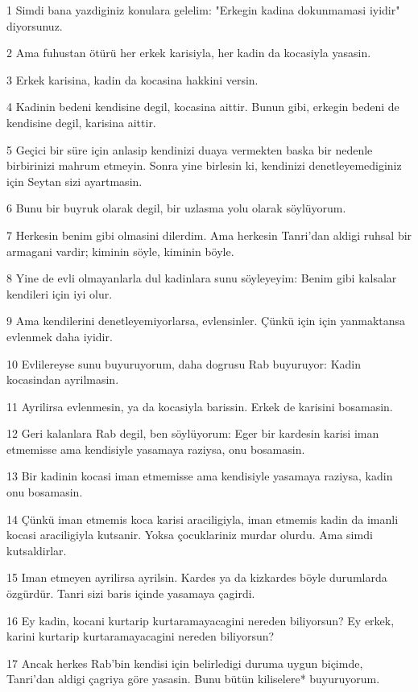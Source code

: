 \par 1 Simdi bana yazdiginiz konulara gelelim: "Erkegin kadina dokunmamasi iyidir" diyorsunuz.
\par 2 Ama fuhustan ötürü her erkek karisiyla, her kadin da kocasiyla yasasin.
\par 3 Erkek karisina, kadin da kocasina hakkini versin.
\par 4 Kadinin bedeni kendisine degil, kocasina aittir. Bunun gibi, erkegin bedeni de kendisine degil, karisina aittir.
\par 5 Geçici bir süre için anlasip kendinizi duaya vermekten baska bir nedenle birbirinizi mahrum etmeyin. Sonra yine birlesin ki, kendinizi denetleyemediginiz için Seytan sizi ayartmasin.
\par 6 Bunu bir buyruk olarak degil, bir uzlasma yolu olarak söylüyorum.
\par 7 Herkesin benim gibi olmasini dilerdim. Ama herkesin Tanri'dan aldigi ruhsal bir armagani vardir; kiminin söyle, kiminin böyle.
\par 8 Yine de evli olmayanlarla dul kadinlara sunu söyleyeyim: Benim gibi kalsalar kendileri için iyi olur.
\par 9 Ama kendilerini denetleyemiyorlarsa, evlensinler. Çünkü için için yanmaktansa evlenmek daha iyidir.
\par 10 Evlilereyse sunu buyuruyorum, daha dogrusu Rab buyuruyor: Kadin kocasindan ayrilmasin.
\par 11 Ayrilirsa evlenmesin, ya da kocasiyla barissin. Erkek de karisini bosamasin.
\par 12 Geri kalanlara Rab degil, ben söylüyorum: Eger bir kardesin karisi iman etmemisse ama kendisiyle yasamaya raziysa, onu bosamasin.
\par 13 Bir kadinin kocasi iman etmemisse ama kendisiyle yasamaya raziysa, kadin onu bosamasin.
\par 14 Çünkü iman etmemis koca karisi araciligiyla, iman etmemis kadin da imanli kocasi araciligiyla kutsanir. Yoksa çocuklariniz murdar olurdu. Ama simdi kutsaldirlar.
\par 15 Iman etmeyen ayrilirsa ayrilsin. Kardes ya da kizkardes böyle durumlarda özgürdür. Tanri sizi baris içinde yasamaya çagirdi.
\par 16 Ey kadin, kocani kurtarip kurtaramayacagini nereden biliyorsun? Ey erkek, karini kurtarip kurtaramayacagini nereden biliyorsun?
\par 17 Ancak herkes Rab'bin kendisi için belirledigi duruma uygun biçimde, Tanri'dan aldigi çagriya göre yasasin. Bunu bütün kiliselere* buyuruyorum.
